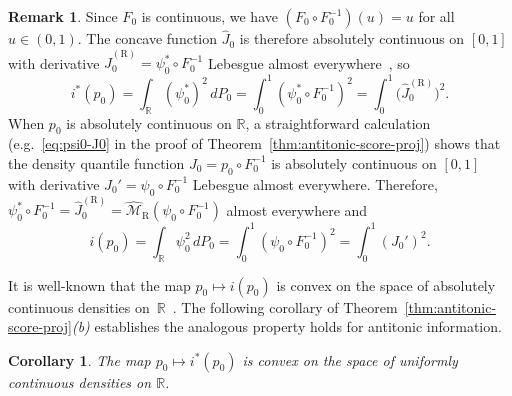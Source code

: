 \documentclass[a4paper]{article}
\newcommand{\R}{\mathbb{R}}
\newtheorem{corollary}[theorem]{Corollary}
\theoremstyle{definition}
\newtheorem{remark}[theorem]{Remark}
\begin{document}
\begin{remark}
\label{rem:fisher-J}
Since $F_0$ is continuous, we have $(F_0 \circ F_0^{-1})(u) = u$ for all $u \in (0,1)$. The concave function $\hat{J}_0$ is therefore absolutely continuous on $[0,1]$ with derivative $\hat{J}_0^{(\mathrm{R})} = \psi_0^* \circ F_0^{-1}$ Lebesgue almost everywhere~\citep[Corollary~24.2.1]{rockafellar97convex}, so
\[
i^*(p_0) = \int_\R (\psi_0^*)^2\,dP_0 = \int_0^1 (\psi_0^* \circ F_0^{-1})^2 = \int_0^1 \bigl(\hat{J}_0^{(\mathrm{R})}\bigr)^2.
\]
When $p_0$ is absolutely continuous on $\R$, a straightforward calculation (e.g.~\eqref{eq:psi0-J0} in the proof of Theorem~\ref{thm:antitonic-score-proj}) shows that the density quantile function $J_0 = p_0 \circ F_0^{-1}$ is absolutely continuous on $[0,1]$ with derivative $J_0' = \psi_0 \circ F_0^{-1}$ Lebesgue almost everywhere. Therefore, $\psi_0^* \circ F_0^{-1} = \hat{J}_0^{(\mathrm{R})} = \widehat{\mathcal{M}}_\mathrm{R}(\psi_0 \circ F_0^{-1})$ almost everywhere and
\[
i(p_0) = \int_\R \psi_0^2\,dP_0 = \int_0^1 (\psi_0 \circ F_0^{-1})^2 = \int_0^1 (J_0')^2.
\]
\end{remark}
It is well-known that the map $p_0 \mapsto i(p_0)$ is convex on the space of absolutely continuous densities on~$\R$~\citep[e.g.][Section~4.4, p.~78]{huber2009robust}. 
The following corollary of Theorem~\ref{thm:antitonic-score-proj}\textit{(b)} establishes the analogous property holds for antitonic information.
\begin{corollary}
\label{cor:istar-cvx}
The map $p_0 \mapsto i^*(p_0)$ is convex on the space of uniformly continuous densities on $\R$.
\end{corollary}
\end{document}

